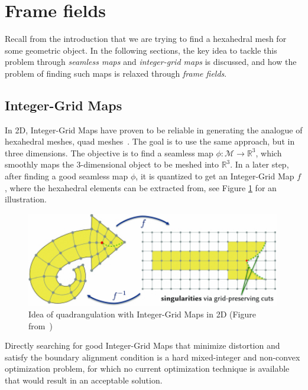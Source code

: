 \documentclass[../thesis.tex]{subfiles}
\begin{document}
\section{Frame fields}
Recall from the introduction that we are trying to find a hexahedral mesh
for some geometric object. In the following sections, the key idea to
tackle this problem through \emph{seamless maps} and \emph{integer-grid maps} is discussed, and
how the problem of finding such maps is relaxed through \emph{frame fields}.
\subsection{Integer-Grid Maps}

In 2D, Integer-Grid Maps have proven to be reliable
in generating the analogue of hexahedral meshes, quad meshes~\cite{integer-grid}.
The goal is to use the same approach, but in three dimensions.
The objective is to find a seamless map
$\phi : \mathcal{M} \to \mathbb{R}^3$, which smoothly maps the $3$-dimensional object
to be meshed into $\mathbb{R}^3$.
In a later step, after finding a good seamless map $\phi$, it is quantized to get an
Integer-Grid Map $f$, where the hexahedral elements can be extracted from,  see Figure \ref{fig:integer-grid} for an illustration.
\begin{figure}[htb]
  \centering
  \includegraphics[width=30em]{figures/integer-grid-rough}
  \caption{Idea of quadrangulation with Integer-Grid Maps in 2D (Figure from~\cite{Hex22})}
  \label{fig:integer-grid}
\end{figure}
Directly searching for good Integer-Grid Maps that minimize distortion and satisfy the boundary alignment
condition is a hard mixed-integer and non-convex optimization problem, for which no current
optimization technique is available that would result in an acceptable solution.
\end{document}
